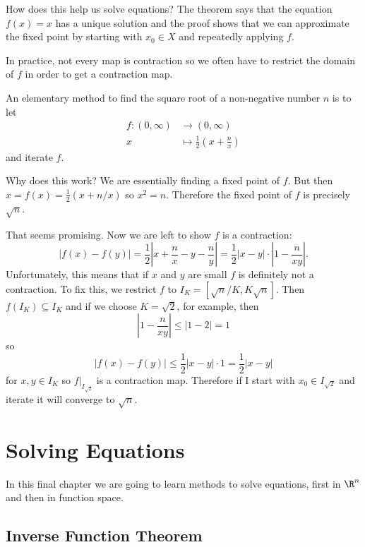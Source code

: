 \documentclass[a4paper]{article}
\theoremstyle{definition}
\begin{document}
\begin{remark}
  How does this help us solve equations? The theorem says that the equation \(f(x) = x\) has a unique solution and the proof shows that we can approximate the fixed point by starting with \(x_0 \in X\) and repeatedly applying \(f\).
\end{remark}

In practice, not every map is contraction so we often have to restrict the domain of \(f\) in order to get a contraction map.

\begin{eg}
  An elementary method to find the square root of a non-negative number \(n\) is to let
  \begin{align*}
    f: (0, \infty) &\to (0, \infty) \\
    x &\mapsto \frac{1}{2} \left( x + \frac{n}{x} \right)
  \end{align*}
  and iterate \(f\).

  Why does this work? We are essentially finding a fixed point of \(f\). But then \(x = f(x) = \frac{1}{2}(x + n/x)\) so \(x^2 = n\). Therefore the fixed point of \(f\) is precisely \(\sqrt n\).

  That seems promising. Now we are left to show \(f\) is a contraction:
  \[
    |f(x) - f(y)| = \frac{1}{2} \left|x + \frac{n}{x} - y - \frac{n}{y} \right| = \frac{1}{2} |x - y| \cdot \left|1 - \frac{n}{xy} \right|.
  \]
  Unfortunately, this means that if \(x\) and \(y\) are small \(f\) is definitely not a contraction. To fix this, we restrict \(f\) to \(I_K = [\sqrt n /K, K \sqrt n]\). Then \(f(I_K) \subseteq I_K\) and if we choose \(K = \sqrt 2\), for example, then
  \[
    \left|1 - \frac{n}{xy} \right| \leq |1 - 2| = 1
  \]
  so
  \[
    |f(x) - f(y)| \leq \frac{1}{2} |x - y| \cdot 1 = \frac{1}{2} |x - y|
  \]
  for \(x, y \in I_K\) so \(f|_{I_{\sqrt 2}}\) is a contraction map. Therefore if I start with \(x_0 \in I_{\sqrt 2}\) and iterate it will converge to \(\sqrt n\).
\end{eg}

\section{Solving Equations}

In this final chapter we are going to learn methods to solve equations, first in \(\R^n\) and then in function space.

\subsection{Inverse Function Theorem}
\end{document}
